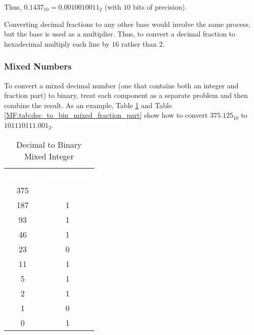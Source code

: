Thus, $ 0.1437_{10} = 0.0010010011_2 $ (with $ 10 $ bits of precision). 

Converting decimal fractions to any other base would involve the same process, but the base is used as a multiplier. Thus, to convert a decimal fraction to hexadecimal multiply each line by $ 16 $ rather than $ 2 $. 

 \subsubsection{Mixed Numbers}
 \label{MF:subsub:decimal_to_binary_mixednumbers}
 To convert a mixed decimal number (one that contains both an integer and fraction part) to binary, treat each component as a separate problem and then combine the result. As an example, Table \ref{MF:tab:dec_to_bin_mixed_integer_part} and Table \ref{MF:tab:dec_to_bin_mixed_fraction_part} show how to convert $ 375.125_{10} $ to $ 1 0111 0111.001_2 $.
 
 \begin{table}[H]
  \sffamily
  \newcommand{\head}[1]{\textcolor{white}{\textbf{#1}}}    
   \begin{center}
     \begin{tabular}{ c c } 
       \hline
      \rowcolor{black!75}
      \head{Integer} & \head{Remainder} \\
       375 &  \\
       187 & 1 \\
       93 & 1 \\
       46 & 1 \\
       23 & 0 \\
       11 & 1 \\
       5 & 1 \\
       2 & 1 \\
       1 & 0 \\
       0 & 1 \\ \hline
     \end{tabular}
   \end{center}
   \caption{Decimal to Binary Mixed Integer}
   \label{MF:tab:dec_to_bin_mixed_integer_part}
 \end{table} 
 
